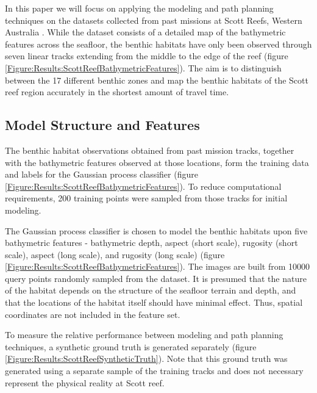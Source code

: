 \documentclass{article}
\begin{document}
	In this paper we will focus on applying the modeling and path planning techniques on the datasets collected from past missions at Scott Reefs, Western Australia \cite{ScottReefData}. While the dataset consists of a detailed map of the bathymetric features across the seafloor, the benthic habitats have only been observed through seven linear tracks extending from the middle to the edge of the reef (figure \ref{Figure:Results:ScottReefBathymetricFeatures}). The aim is to distinguish between the 17 different benthic zones and map the benthic habitats of the Scott reef region accurately in the shortest amount of travel time.
		
	\subsection{Model Structure and Features}
		
		The benthic habitat observations obtained from past mission tracks, together with the bathymetric features observed at those locations, form the training data and labels for the Gaussian process classifier (figure \ref{Figure:Results:ScottReefBathymetricFeatures}). To reduce computational requirements, 200 training points were sampled from those tracks for initial modeling.
		
		The Gaussian process classifier is chosen to model the benthic habitats upon five bathymetric features - bathymetric depth, aspect (short scale), rugosity (short scale), aspect (long scale), and rugosity (long scale) (figure \ref{Figure:Results:ScottReefBathymetricFeatures}). The images are built from 10000 query points randomly sampled from the dataset. It is presumed that the nature of the habitat depends on the structure of the seafloor terrain and depth, and that the locations of the habitat itself should have minimal effect. Thus, spatial coordinates are not included in the feature set.
		
		To measure the relative performance between modeling and path planning techniques, a synthetic ground truth is generated separately (figure \ref{Figure:Results:ScottReefSyntheticTruth}). Note that this ground truth was generated using a separate sample of the training tracks and does not necessary represent the physical reality at Scott reef.
	
\end{document}
